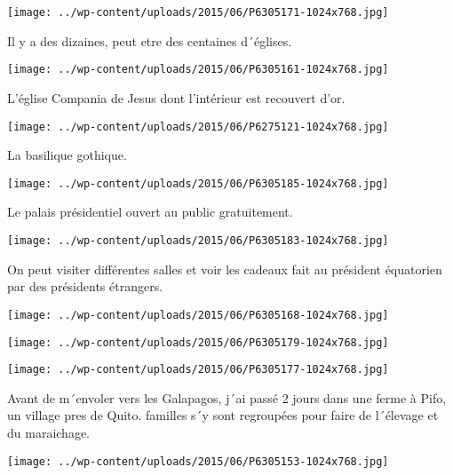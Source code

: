 \centerline{\texttt{[image: ../wp-content/uploads/2015/06/P6305171-1024x768.jpg]} } 
 \newline
 Il y a des dizaines, peut etre des centaines d´églises. \newline
 \newline
\centerline{\texttt{[image: ../wp-content/uploads/2015/06/P6305161-1024x768.jpg]} } 
 \newline
 L'église Compania de Jesus dont l'intérieur est recouvert d'or. \newline
 \newline
\centerline{\texttt{[image: ../wp-content/uploads/2015/06/P6275121-1024x768.jpg]} } 
 \newline
 La basilique gothique. \newline
 \newline
\centerline{\texttt{[image: ../wp-content/uploads/2015/06/P6305185-1024x768.jpg]} } 
 \newline
 Le palais présidentiel ouvert au public gratuitement. \newline
 \newline
\centerline{\texttt{[image: ../wp-content/uploads/2015/06/P6305183-1024x768.jpg]} } 
 \newline
 On peut visiter différentes salles et voir les cadeaux fait au président équatorien par des présidents étrangers. \newline
 \newline
\centerline{\texttt{[image: ../wp-content/uploads/2015/06/P6305168-1024x768.jpg]} } 
 \newline
 \newline
\centerline{\texttt{[image: ../wp-content/uploads/2015/06/P6305179-1024x768.jpg]} } 
 \newline
 \newline
\centerline{\texttt{[image: ../wp-content/uploads/2015/06/P6305177-1024x768.jpg]} } 
 \newline
 Avant de m´envoler vers les Galapagos, j´ai passé 2 jours dans une ferme à Pifo, un village pres de Quito.  familles s´y sont regroupées pour faire de l´élevage et du maraichage. \newline
 \newline
\centerline{\texttt{[image: ../wp-content/uploads/2015/06/P6305153-1024x768.jpg]} } 
 \newline

\newpage
 
